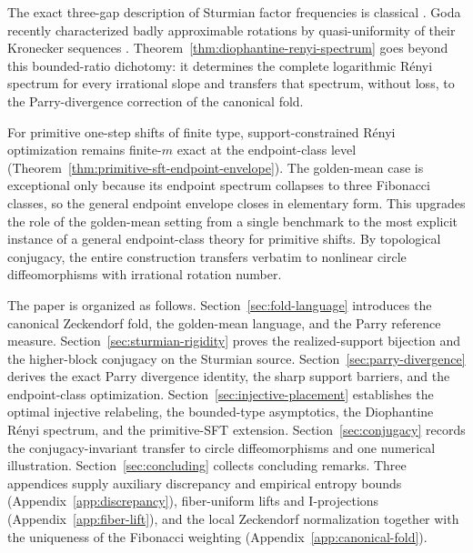 The exact three-gap description of Sturmian factor frequencies is classical
\cite{Berthe1996SturmianFrequencies}. Goda recently characterized badly
approximable rotations by quasi-uniformity of their Kronecker sequences
\cite{Goda2024QuasiUniform}. Theorem~\ref{thm:diophantine-renyi-spectrum}
goes beyond this bounded-ratio dichotomy: it determines the complete
logarithmic R\'enyi spectrum for every irrational slope and transfers that
spectrum, without loss, to the Parry-divergence correction of the canonical
fold.

For primitive one-step shifts of finite type, support-constrained R\'enyi
optimization remains finite-$m$ exact at the endpoint-class level
(Theorem~\ref{thm:primitive-sft-endpoint-envelope}). The golden-mean case
is exceptional only because its endpoint spectrum collapses to three
Fibonacci classes, so the general endpoint envelope closes in elementary
form. This upgrades the role of the golden-mean setting from a single
benchmark to the most explicit instance of a general endpoint-class theory
for primitive shifts. By topological conjugacy, the entire construction
transfers verbatim to nonlinear circle diffeomorphisms with irrational
rotation number.

The paper is organized as follows. Section~\ref{sec:fold-language} introduces
the canonical Zeckendorf fold, the golden-mean language, and the Parry
reference measure. Section~\ref{sec:sturmian-rigidity} proves the
realized-support bijection and the higher-block conjugacy on the Sturmian
source. Section~\ref{sec:parry-divergence} derives the exact Parry divergence
identity, the sharp support barriers, and the endpoint-class optimization.
Section~\ref{sec:injective-placement} establishes the optimal injective
relabeling, the bounded-type asymptotics, the Diophantine R\'enyi spectrum,
and the primitive-SFT extension.
Section~\ref{sec:conjugacy} records the conjugacy-invariant transfer to circle
diffeomorphisms and one numerical illustration. Section~\ref{sec:concluding}
collects concluding remarks. Three appendices supply auxiliary discrepancy and
empirical entropy bounds (Appendix~\ref{app:discrepancy}), fiber-uniform lifts
and I-projections (Appendix~\ref{app:fiber-lift}), and the local Zeckendorf
normalization together with the uniqueness of the Fibonacci weighting
(Appendix~\ref{app:canonical-fold}).
